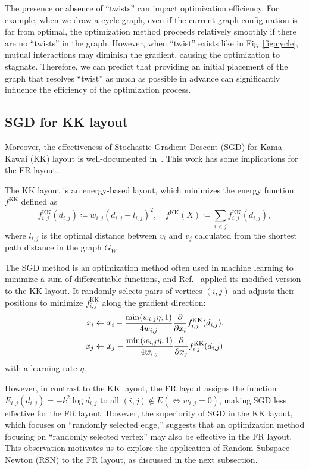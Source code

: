 \documentclass[dvipdfmx,journal]{IEEEtran}
\newcommand{\defeq}{\coloneqq}
\begin{document}
The presence or absence of ``twists'' can impact optimization efficiency.
For example, when we draw a cycle graph, even if the current graph configuration is far from optimal, the optimization method proceeds relatively smoothly if there are no ``twists'' in the graph.
However, when ``twist'' exists like in Fig~\ref{fig:cycle}, mutual interactions may diminish the gradient, causing the optimization to stagnate.
Therefore, we can predict that providing an initial placement of the graph that resolves ``twist'' as much as possible in advance can significantly influence the efficiency of the optimization process.

\subsection{SGD for KK layout}\label{ssec:sgd}

Moreover, the effectiveness of Stochastic Gradient Descent (SGD) for Kama--Kawai (KK) layout is well-documented in~\cite{8419285}. This work has some implications for the FR layout.

The KK layout is an energy-based layout, which minimizes the energy function $f^{\mathrm{KK}}$ defined as
\begin{equation*}
  f^{\mathrm{KK}}_{i,j}(d_{i,j}) \defeq w_{i,j} (d_{i,j}-l_{i,j})^2, \quad
  f^{\mathrm{KK}}(X) \defeq \sum_{i<j} f^{\mathrm{KK}}_{i,j}(d_{i,j}),
\end{equation*}
where $l_{i,j}$ is the optimal distance between $v_i$ and $v_j$ calculated from the shortest path distance in the graph $G_W$.

The SGD method is an optimization method often used in machine learning to minimize a sum of differentiable functions, and Ref.~\cite{8419285} applied its modified version to the KK layout.
It randomly selects pairs of vertices $(i,j)$ and adjusts their positions to minimize $f^{\mathrm{KK}}_{i,j}$ along the gradient direction:
\begin{align*}
  x_i & \gets x_i - \frac{\min(w_{i,j}\eta,1)}{4w_{i,j}} \pdv{x_i} f^{\mathrm{KK}}_{i,j}(d_{i,j}), \\
  x_j & \gets x_j - \frac{\min(w_{i,j}\eta,1)}{4w_{i,j}} \pdv{x_j} f^{\mathrm{KK}}_{i,j}(d_{i,j})
\end{align*}
with a learning rate $\eta$.

However, in contrast to the KK layout, the FR layout assigns the function $E_{i,j}(d_{i,j})=-k^2\log{d_{i,j}}$ to all $(i,j) \notin E (\iff w_{i,j}=0)$, making SGD less effective for the FR layout.
However, the superiority of SGD in the KK layout, which focuses on ``randomly selected edge,'' suggests that an optimization method focusing on ``randomly selected vertex'' may also be effective in the FR layout.
This observation motivates us to explore the application of Random Subspace Newton (RSN) to the FR layout, as discussed in the next subsection.
\end{document}
